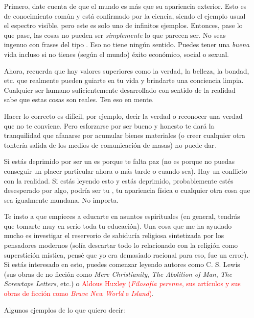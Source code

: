 \documentclass[12pt]{article}
\begin{document}
	Primero, date cuenta de que el mundo es más que su apariencia exterior.
	Esto es de conocimiento común y está confirmado por la ciencia, siendo
	el ejemplo usual el espectro visible, pero este es solo uno de infinitos
	ejemplos. Entonces, pase lo que pase, las cosas no pueden ser
	\textit{simplemente} lo que parecen ser. No seas ingenuo con frases del
	tipo . Eso no
	tiene ningún sentido. Puedes tener una \textit{buena} vida incluso si no
	tienes (según el mundo) éxito económico, social o sexual.

	Ahora, recuerda que hay valores superiores como la verdad, la belleza,
	la bondad, etc. que realmente pueden guiarte en tu vida y brindarte una
	conciencia limpia. Cualquier ser humano suficientemente desarrollado con
	sentido de la realidad sabe que estas cosas son reales. Ten eso en
	mente.

	Hacer lo correcto es difícil, por ejemplo, decir la verdad o reconocer
	una verdad que no te conviene. Pero esforzarse por ser bueno y honesto
	te dará la tranquilidad que afanarse por acumular bienes materiales (o
	creer cualquier otra tontería salida de los medios de comunicación
	de masas) no puede dar.

	Si estás deprimido por ser un  es porque te falta
	paz (no es porque no puedas conseguir un placer particular ahora o más
	tarde o cuando sea). Hay un conflicto con la realidad. Si estás leyendo
	esto y estás deprimido, probablemente estés desesperado por algo,
	podría ser tu , tu apariencia física o
	cualquier otra cosa que sea igualmente mundana. No importa.

	Te insto a que empieces a educarte en asuntos espirituales (en general,
	tendrás que tomarte muy en serio toda tu educación). Una cosa que me ha
	ayudado mucho es investigar el reservorio de sabiduría religiosa
	sintetizada por los pensadores modernos (solía descartar todo lo
	relacionado con la religión como superstición mística, pensé que yo era
	demasiado racional para eso, fue un error). Si estás interesado en esto,
	puedes comenzar leyendo autores como C. S. Lewis (sus obras de no
	ficción como \textit{Mere Christianity}, \textit{The Abolition of Man},
	\textit{The Screwtape Letters}, etc.) o \textcolor{red}{Aldous Huxley
	(\textit{Filosofía perenne}, sus artículos y sus obras de ficción
	como \textit{Brave New World} e \textit{Island})}.


	Algunos ejemplos de lo que quiero decir:
\end{document}

